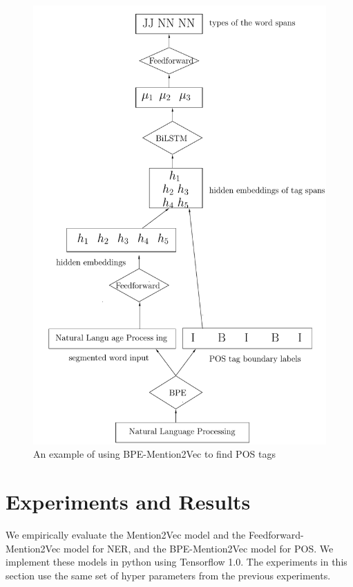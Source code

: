 \documentclass{sfuthesis}
\begin{document}
\begin{figure}
  \centering
  \includegraphics[scale=0.6]{bpemention2vec.pdf}
 \caption{An example of using BPE-Mention2Vec to find POS tags}
  \label{fig:bpemention2vec}
\end{figure}

\section{Experiments and Results}

We empirically evaluate the Mention2Vec model and the Feedforward-Mention2Vec model for NER, and the BPE-Mention2Vec model for POS. We implement these models in python using Tensorflow 1.0. The experiments in this section use the same set of hyper parameters from the previous experiments. 
\end{document}
